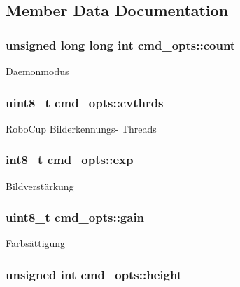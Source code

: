 \subsection{Member Data Documentation}
\hypertarget{structcmd__opts_a582f29b5e8c3328779e88bcb22ff3c2e}{
\subsubsection[{count}]{\setlength{\rightskip}{0pt plus 5cm}unsigned long long int cmd\+\_\+opts\+::count}}\label{structcmd__opts_a582f29b5e8c3328779e88bcb22ff3c2e}
Daemonmodus \hypertarget{structcmd__opts_a6d2fcb749257ff950fabdb000999d7f9}{
\subsubsection[{cvthrds}]{\setlength{\rightskip}{0pt plus 5cm}uint8\+\_\+t cmd\+\_\+opts\+::cvthrds}}\label{structcmd__opts_a6d2fcb749257ff950fabdb000999d7f9}
Robo\+Cup Bilderkennungs-\/ Threads \hypertarget{structcmd__opts_aa6ef1ebf0fbaa8bd7016a8ef1a2c5ef4}{
\subsubsection[{exp}]{\setlength{\rightskip}{0pt plus 5cm}int8\+\_\+t cmd\+\_\+opts\+::exp}}\label{structcmd__opts_aa6ef1ebf0fbaa8bd7016a8ef1a2c5ef4}
Bildverstärkung \hypertarget{structcmd__opts_a55323cae5dfbafe672e6581da99985b9}{
\subsubsection[{gain}]{\setlength{\rightskip}{0pt plus 5cm}uint8\+\_\+t cmd\+\_\+opts\+::gain}}\label{structcmd__opts_a55323cae5dfbafe672e6581da99985b9}
Farbsättigung \hypertarget{structcmd__opts_a0ab9c9cf886559f8cf19dd2f7be072fb}{
\subsubsection[{height}]{\setlength{\rightskip}{0pt plus 5cm}unsigned int cmd\+\_\+opts\+::height}}\label{structcmd__opts_a0ab9c9cf886559f8cf19dd2f7be072fb}
